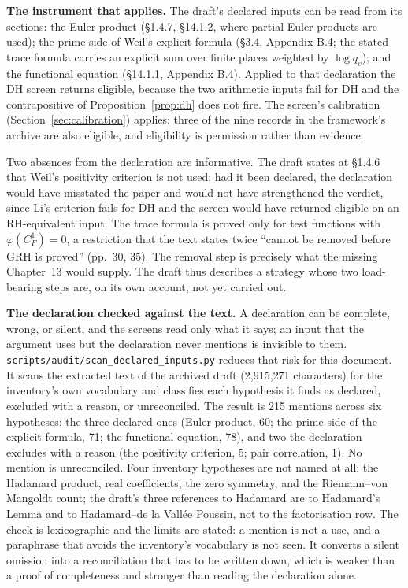 \documentclass[11pt,a4paper]{article}
\newcommand{\RH}{\mathrm{RH}}
\newcommand{\verdict}[1]{\textsf{#1}}
\begin{document}
\textbf{The instrument that applies.} The draft's declared inputs can be read from its
sections: the Euler product (\S1.4.7, \S14.1.2, where partial Euler products are used); the prime
side of Weil's explicit formula (\S3.4, Appendix B.4; the stated trace formula carries an explicit
sum over finite places weighted by $\log q_v$); and the functional equation (\S14.1.1, Appendix
B.4). Applied to that declaration the DH screen returns \verdict{eligible}, because the two
arithmetic inputs fail for DH and the contrapositive of Proposition~\ref{prop:dh} does not fire.
The screen's calibration (Section~\ref{sec:calibration}) applies: three of the nine records in the
framework's archive are also eligible, and eligibility is permission rather than evidence.

Two absences from the declaration are informative. The draft states at \S1.4.6 that
Weil's positivity criterion is not used; had it been declared, the declaration would have misstated
the paper and would not have strengthened the verdict, since Li's criterion fails for DH and the
screen would have returned \verdict{eligible} on an $\RH$-equivalent input. The trace formula is
proved only for test functions with $\varphi(C_F^{1})=0$, a restriction that the text states twice
``cannot be removed before GRH is proved'' (pp.~30, 35). The removal step is precisely what the
missing Chapter~13 would supply. The draft thus describes a strategy whose two load-bearing steps
are, on its own account, not yet carried out.

\textbf{The declaration checked against the text.} A declaration can be complete, wrong, or
silent, and the screens read only what it says; an input that the argument uses but the
declaration never mentions is invisible to them. \texttt{scripts/audit/scan\_declared\_inputs.py}
reduces that risk for this document. It scans the extracted text of the archived draft
(2{,}915{,}271 characters) for the inventory's own vocabulary and classifies each hypothesis it
finds as declared, excluded with a reason, or unreconciled. The result is 215 mentions across six
hypotheses: the three declared ones (Euler product, 60; the prime side of the explicit formula,
71; the functional equation, 78), and two the declaration excludes with a reason (the positivity
criterion, 5; pair correlation, 1). No mention is unreconciled. Four inventory hypotheses are not
named at all: the Hadamard product, real coefficients, the zero symmetry, and the
Riemann--von Mangoldt count; the draft's three references to Hadamard are to Hadamard's Lemma and
to Hadamard--de la Vall\'ee Poussin, not to the factorisation row. The check is lexicographic and
the limits are stated: a mention is not a use, and a paraphrase that avoids the inventory's
vocabulary is not seen. It converts a silent omission into a reconciliation that has to be
written down, which is weaker than a proof of completeness and stronger than reading the
declaration alone.
\end{document}
